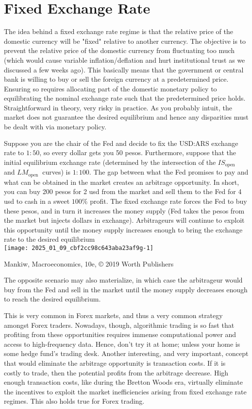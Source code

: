 \documentclass[10pt]{article}
\begin{document}
\section*{Fixed Exchange Rate}
The idea behind a fixed exchange rate regime is that the relative price of the domestic currency will be "fixed" relative to another currency. The objective is to prevent the relative price of the domestic currency from fluctuating too much (which would cause variable inflation/deflation and hurt institutional trust as we discussed a few weeks ago). This basically means that the government or central bank is willing to buy or sell the foreign currency at a predetermined price. Ensuring so requires allocating part of the domestic monetary policy to equilibrating the nominal exchange rate such that the predetermined price holds. Straightforward in theory, very risky in practice. As you probably intuit, the market does not guarantee the desired equilibrium and hence any disparities must be dealt with via monetary policy.

Suppose you are the chair of the Fed and decide to fix the USD:ARS exchange rate to $1: 50$, so every dollar gets you 50 pesos. Furthermore, suppose that the initial equilibrium exchange rate (determined by the intersection of the $I S_{\text {open }}$ and $L M_{\text {open }}$ curves) is $1: 100$. The gap between what the Fed promises to pay and what can be obtained in the market creates an arbitrage opportunity. In short, you can buy 200 pesos for 2 usd from the market and sell them to the Fed for 4 usd to cash in a sweet $100 \%$ profit. The fixed exchange rate forces the Fed to buy these pesos, and in turn it increases the money supply (Fed takes the pesos from the market but injects dollars in exchange). Arbitrageurs will continue to exploit this opportunity until the money supply increases enough to bring the exchange rate to the desired equilibrium\\
\texttt{[image: 2025\_01\_09\_cbf2cc98c643aba23af9g-1]}

Mankiw, Macroeconomics, 10e, © 2019 Worth Publishers

The opposite scenario may also materialize, in which case the arbitrageur would buy from the Fed and sell in the market until the money supply decreases enough to reach the desired equilibrium.

This is very common in Forex markets, and thus a very common strategy amongst Forex traders. Nowadays, though, algorithmic trading is so fast that profiting from these opportunities requires immense computational power and access to high-frequency data. Hence, don't try it at home; unless your home is some hedge fund's trading desk. Another interesting, and very important, concept that would eliminate the arbitrage opportunity is transaction costs. If it is\\
costly to trade, then the potential profits from the arbitrage decrease. High enough transaction costs, like during the Bretton Woods era, virtually eliminate the incentives to exploit the market inefficiencies arising from fixed exchange rate regimes. This also holds true for Forex trading.
\end{document}

